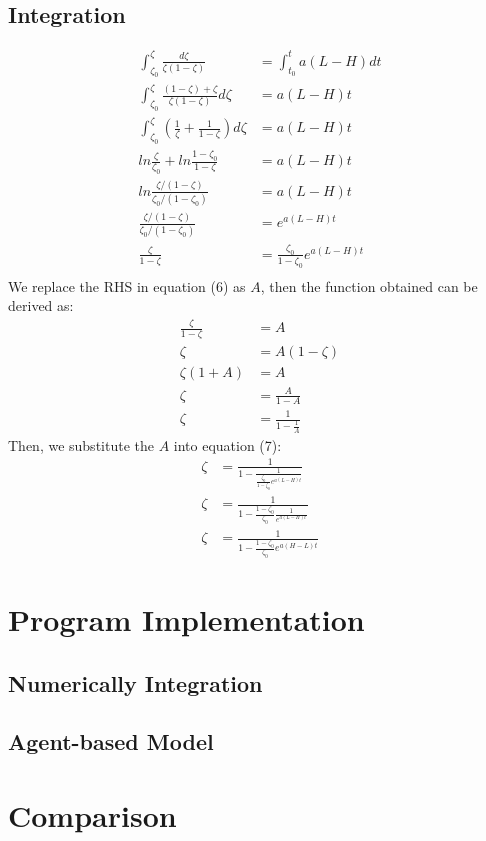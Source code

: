 \documentclass[a4paper, 12pt]{article}
\begin{document}
\subsection{Integration}
\begin{equation}
\begin{split}
	\int_{\zeta_{0}}^{\zeta} \frac{d\zeta}{\zeta(1-\zeta)} &= \int_{t_{0}}^{t} a(L-H)dt \\
	\int_{\zeta_{0}}^{\zeta} \frac{(1-\zeta)+\zeta}{\zeta(1-\zeta)}d\zeta & = a(L-H)t \\
	\int_{\zeta_{0}}^{\zeta} (\frac{1}{\zeta} + \frac{1}{1-\zeta})d\zeta &= a(L-H)t \\
	ln\frac{\zeta}{\zeta_{0}} + ln\frac{1-\zeta_{0}}{1-\zeta} & = a(L-H)t \\
	ln\frac{\zeta/(1-\zeta)}{\zeta_{0}/(1-\zeta_{0})} & = a(L-H)t \\
	\frac{\zeta/(1-\zeta)}{\zeta_{0}/(1-\zeta_{0})} & = e^{a(L-H)t} \\
	\frac{\zeta}{1-\zeta} & = \frac{\zeta_{0}}{1-\zeta_{0}}e^{a(L-H)t} \\
\end{split}
\end{equation}
We replace the RHS in equation (6) as $A$, then the function obtained can be derived as:
\begin{equation}
\begin{split}
	\frac{\zeta}{1-\zeta} &= A \\
	\zeta & = A (1-\zeta) \\
	\zeta (1+A) & = A \\
	\zeta & = \frac{A}{1-A} \\
	\zeta & = \frac{1}{1 - \frac{1}{A}}
\end{split}
\end{equation}
Then, we substitute the $A$ into equation (7):
\begin{equation}
\begin{split}
	\zeta &= \frac{1}{1-\frac{1}{\frac{\zeta_{0}}{1-\zeta_{0}}e^{a(L-H)t}}} \\
	\zeta &= \frac{1}{1-\frac{1-\zeta_{0}}{\zeta_{0}}\frac{1}{e^{a(L-H)t}}} \\
	\zeta &= \frac{1}{1-\frac{1-\zeta_{0}}{\zeta_{0}}e^{a(H-L)t}}
\end{split}
\end{equation}

\section{Program Implementation}
\subsection{Numerically Integration}
\subsection{Agent-based Model}
\section{Comparison}
\end{document}

